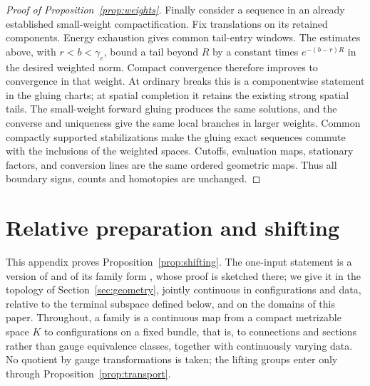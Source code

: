 \documentclass[11pt]{amsart}
\theoremstyle{definition}
\theoremstyle{remark}
\theoremstyle{plain}
\numberwithin{equation}{section}
\begin{document}
\begin{proof}[Proof of Proposition~\ref{prop:weights}]
Finally consider a sequence in an already established small-weight
compactification. Fix translations on its retained components.
Energy exhaustion gives common tail-entry windows. The estimates
above, with $r<b<\gamma_e$, bound a tail beyond $R$ by a constant
times $e^{-(b-r)R}$ in the desired weighted norm. Compact convergence
therefore improves to convergence in that weight. At ordinary
breaks this is a componentwise statement in the gluing charts;
at spatial completion it retains the existing strong spatial
tails. The small-weight forward gluing produces the same
solutions, and the converse and uniqueness give the same local
branches in larger weights. Common compactly supported stabilizations
make the gluing exact sequences commute with the inclusions of the
weighted spaces. Cutoffs, evaluation maps, stationary factors, and
conversion lines are the same ordered geometric maps. Thus all
boundary signs, counts and homotopies are unchanged.
\end{proof}

\section{Relative preparation and shifting}\label{app:shifting}

This appendix proves Proposition~\ref{prop:shifting}. The one-input
statement is a version of \cite[Lemma~4.62]{DFL} and of its family
form \cite[Lemma~4.64]{DFL}, whose proof is sketched there; we give it in the topology of
Section~\ref{sec:geometry}, jointly continuous in configurations and
data, relative to the terminal subspace defined below, and on the domains of this
paper. Throughout, a family is a continuous map from a compact metrizable
space $K$ to configurations on a fixed bundle, that is, to connections
and sections rather than gauge equivalence classes, together with
continuously varying data. No quotient by gauge transformations is
taken; the lifting groups enter only through
Proposition~\ref{prop:transport}.
\end{document}
